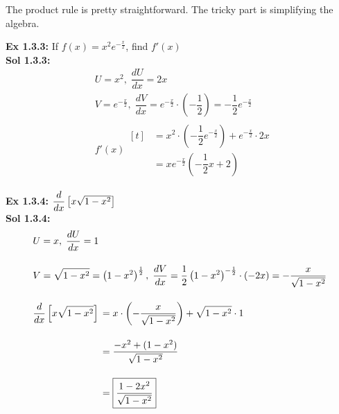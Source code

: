 The product rule is pretty straightforward. The tricky part is simplifying the algebra. \par

\textbf{Ex 1.3.3: } If $f(x) = x^2e^{-\frac{x}{2}}$, find $f'(x)$ \\[11pt]
\textbf{Sol 1.3.3: } \begin{align*}
    & U = x^2, \; \dfrac{dU}{dx} = 2x \\[11pt]
    & V = e^{-\frac{x}{2}}, \; \dfrac{dV}{dx} = e^{-\frac{x}{2}} \cdot \left(-\dfrac{1}{2}\right) = -\dfrac{1}{2}e^{-\frac{x}{2}} \\[11pt]
    & f'(x) \begin{aligned}[t]
        & = x^2 \cdot \left(-\dfrac{1}{2}e^{-\frac{x}{2}}\right) + e^{-\frac{x}{2}} \cdot 2x \\[11pt]
        & = \boxed{xe^{-\frac{x}{2}}\left(-\dfrac{1}{2}x + 2\right)}
    \end{aligned}
\end{align*} 

\textbf{Ex 1.3.4: } $\dfrac{d}{dx} \left[x\sqrt{1 - x^2}\right]$ \\[11pt]
\textbf{Sol 1.3.4: } \begin{align*}
    & U = x, \; \dfrac{dU}{dx} = 1 \\[11pt]
    & V = \sqrt{1 - x^2} = \left(1 - x^2\right)^\frac{1}{2}, \; \dfrac{dV}{dx} = \dfrac{1}{2}\left(1 - x^2\right)^{-\frac{1}{2}} \cdot (-2x) = -\dfrac{x}{\sqrt{1 - x^2}} \\[11pt]
    & \dfrac{d}{dx} \left[x\sqrt{1 - x^2}\right] \begin{aligned}[t]
        & = x \cdot \left(-\dfrac{x}{\sqrt{1 - x^2}}\right) + \sqrt{1 - x^2} \cdot 1 \\[11pt]
        & = \dfrac{-x^2 + (1 - x^2)}{\sqrt{1 - x^2}} \\[11pt]
        & = \boxed{\dfrac{1 - 2x^2}{\sqrt{1 - x^2}}}
    \end{aligned}
\end{align*}

